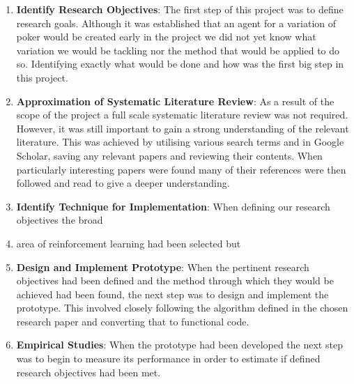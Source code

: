 \begin{enumerate}
    \item \textbf{Identify Research Objectives}: The first step of this project was to define research goals.
    Although it was established that an agent for a variation of poker would be created early
    in the project we did not yet know what variation we would be tackling nor the method that would
    be applied to do so.
    Identifying exactly what would be done and how was the first big step in this project.
    \item \textbf{Approximation of Systematic Literature Review}: As a result of the scope
    of the project a full scale systematic literature review was not required.
    However, it was still important to gain a strong understanding of the relevant literature.
    This was achieved by utilising various search terms and in Google Scholar, saving
    any relevant papers and reviewing their contents.
    When particularly interesting papers were found many of their references were then
    followed and read to give a deeper understanding.
    \item \textbf{Identify Technique for Implementation}: When defining our research objectives the broad
    \item area of reinforcement learning had been selected but
    \item \textbf{Design and Implement Prototype}: When the pertinent research objectives had been
    defined and the method through which they would be achieved had been found, the next step
    was to design and implement the prototype.
    This involved closely following the algorithm defined in the chosen research paper and
    converting that to functional code.
    \item \textbf{Empirical Studies}: When the prototype had been developed the next step was to begin to
    measure its performance in order to estimate if defined research objectives had been met.
\end{enumerate}

